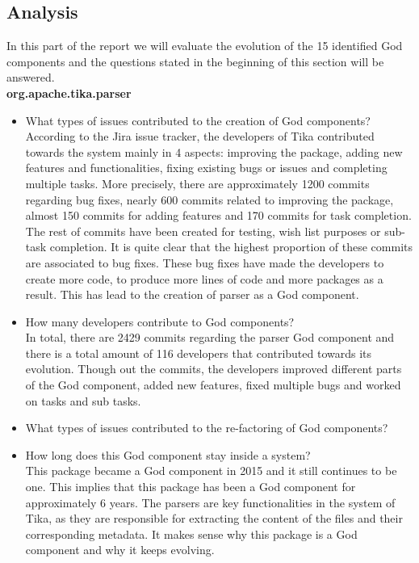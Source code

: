 \documentclass{article}
\begin{document}
\subsection{Analysis}
In this part of the report we will evaluate the evolution of the 15 identified God components and the questions stated in the beginning of this section will be answered.\\

\textbf{org.apache.tika.parser}
\begin{itemize}
    \item What types of issues contributed to the creation of God components? \\
    According to the Jira issue tracker, the developers of Tika contributed towards the system mainly in 4 aspects: improving the package, adding new features and functionalities, fixing existing bugs or issues and completing multiple tasks. More precisely, there are approximately 1200 commits regarding bug fixes, nearly 600 commits related to improving the package, almost 150 commits for adding features and 170 commits for task completion. The rest of commits have been created for testing, wish list purposes or sub-task completion. It is quite clear that the highest proportion of these commits are associated to bug fixes. These bug fixes have made the developers to create more code, to produce more lines of code and more packages as a result. This has lead to the creation of parser as a God component. 
    \item How many developers contribute to God components?\\ In total, there are 2429 commits regarding the parser God component and there is a total amount of 116 developers that contributed towards its evolution. Though out the commits, the developers improved different parts of the God component, added new features, fixed multiple bugs and worked on tasks and sub tasks.  
     \item What types of issues contributed to the re-factoring of God components?\\
    \item How long does this God component stay inside a system?\\ This package became a God component in 2015 and it still continues to be one. This implies that this package has been a God component for approximately 6 years. The parsers are key functionalities in the system of Tika, as they are responsible for extracting the content of the files and their corresponding metadata. It makes sense why this package is a God component and why it keeps evolving.

\end{itemize}
\end{document}
